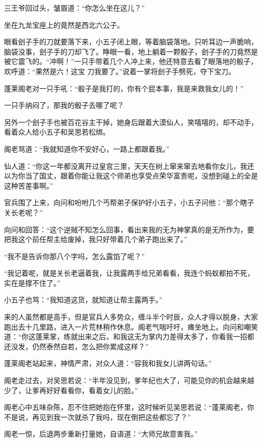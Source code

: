 三王爷回过头，皱眉道：“你怎么坐在这儿？”

坐在九龙宝座上的竟然是西北六公子。
\newline

眼看刽子手的刀就要落下来，小五子闭上眼，等着脑袋落地。只听耳边一声脆响，脑袋没事，刽子手的刀却飞了。睁眼一看，地上躺着一颗骰子，刽子手的刀竟然是被它震飞的。“冲啊！”一只手带着几个人冲上来，他还特意去看了眼落地的骰子，欢呼道：“果然是六！这宝
刀我要了。”说着一掌将刽子手劈死，夺下宝刀。

蓬莱阁老对一只手吼：“骰子是我打的，你有个屁本事，我是来救我女儿的！”

一只手纳闷了，那我的骰子去哪了呢？

另外一个刽子手也被百花谷主干掉，她身后跟着大漠仙人，笑嘻嘻的，却不动手，看着众人给小五子和吴思若松绑。

阁老骂道：“我就知道你不安好心，一路上都跟着我。”

仙人道：“你这一年都没离开过皇宫三里，天天在树上窜来窜去地看你女儿，我还以为你当了国丈，跟着你能让我这个师弟也享受点荣华富贵呢，没想到碰上的全是这种苦差事啊。”

官兵围了上来，向问和吩咐几个丐帮弟子保护好小五子，小五子问他：“那个瞎子关长老呢？”

向问和回答：“这个逆贼不知怎么回事，看出来我的无为神掌真的是无所作为，要把我这个前任帮主给废掉，我只好带着几个弟子跑出来了。”

“我不是告诉你那八个字吗，怎么露馅了呢？”

“我记着呢，就是关长老逼着我，让我露两手给兄弟看看，我连个蚂蚁都拍不死，实在是撑不住了。”

小五子也骂：“我知道这货，就知道让帮主露两手。”
\newline

来的人虽然都是高手，但是官兵人多势众，缠斗半个时辰，众人才得以脱身，大家跑出去十几里路，进入一片荒林稍作休息。阁老气喘吁吁，瘫坐地上。向问和嘲笑道：“你这蓬莱掌，练就出来之后，和我这无为掌内力差得太多了，你看我一招都还没发，仍然泰然自若，怎么把你累成这样？”

蓬莱阁老站起来，神情严肃，对众人道：“容我和我女儿讲两句话。”

阁老走过去，对吴思若说：“半年没见到，爹年纪也大了，可能见你的机会越来越少了，让爹再好好看看你，看着女儿的脸。”

阁老心中五味杂陈，忍不住把她抱在怀里，这时候听见吴思若说：“蓬莱阁老，你不是说，再见到我一次就杀了我吗，现在倒把这些都忘了？”

阁老一惊，后退两步重新打量她，自语道：“大师兄故意害我。”

